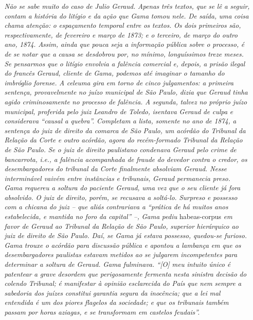 \begin{didascalia}
\emph{Não se sabe muito do caso de Julio Geraud. Apenas três textos, que
se lê a seguir, contam a história do litígio e da ação que Gama tomou
nele. De saída, uma coisa chama atenção: o espaçamento temporal entre os
textos. Os dois primeiros são, respectivamente, de fevereiro e março de
1873; e o terceiro, de março do outro ano, 1874. Assim, ainda que pouca
seja a informação pública sobre o processo, é de se notar que a causa se
desdobrou por, no mínimo, longuíssimos treze meses. Se pensarmos que o
litígio envolvia a falência comercial e, depois, a prisão ilegal do
francês Geraud, cliente de Gama, podemos até imaginar o tamanho do
imbróglio forense. A celeuma gira em torno de cinco julgamentos: a
primeira sentença, provavelmente no juízo municipal de São Paulo, dizia
que Geraud tinha agido criminosamente no processo de falência. A
segunda, talvez no próprio juízo municipal, proferida pelo juiz Leandro
de Toledo, isentava Geraud de culpa e considerava ``causal a quebra''.
Completam a lista, somente no ano de 1874, a sentença do juiz de direito
da comarca de São Paulo, um acórdão do Tribunal da Relação da Corte e
outro acórdão, agora do recém-formado Tribunal da Relação de São Paulo.
Se o juiz de direito paulistano condenava Geraud pelo crime de
bancarrota, i.e., a falência acompanhada de fraude do devedor contra o
credor, os desembargadores do tribunal da Corte finalmente absolviam
Geraud. Nesse interminável vaivém entre instâncias e tribunais, Geraud
permanecia preso. Gama requereu a soltura do paciente Geraud, uma vez
que o seu cliente já fora absolvido. O juiz de direito, porém, se
recusava a soltá-lo. Surpreso e possesso com a chicana do juiz -- que
aliás contrariava a ``prática de há muitos anos estabelecida, e mantida
no foro da capital'' --, Gama pediu} habeas-corpus \emph{em favor de
Geraud ao Tribunal da Relação de São Paulo, superior hierárquico ao juiz
de direito de São Paulo. Daí, se Gama já estava possesso, quedou-se
furioso. Gama trouxe o acórdão para discussão pública e apontou a
lambança em que os desembargadores paulistas estavam metidos ao se
julgarem incompetentes para determinar a soltura de Geraud. Gama
fulminava. ``{[}O{]} meu intuito único é patentear a grave desordem que
perigosamente fermenta nesta sinistra decisão do colendo Tribunal; é
manifestar à opinião esclarecida do País que nem sempre a sabedoria dos
juízes constitui garantia segura da inocência; que a lei mal entendida é
um dos piores flagelos da sociedade; e que os tribunais também passam
por horas aziagas, e se transformam em castelos feudais''.}
\end{didascalia}

